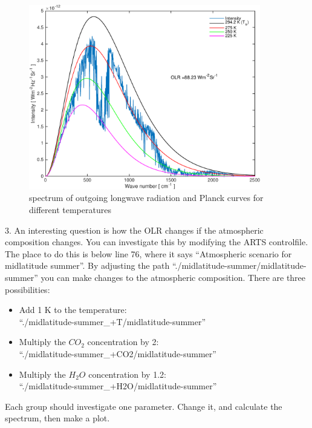 \documentclass[paper=a4, fontsize=11pt]{scrartcl} %
\numberwithin{figure}{section}
\begin{document}
\begin{figure}[H]
\centering
	\includegraphics[width=0.9\textwidth]{plots/olr.pdf}
	\caption{spectrum of outgoing longwave radiation and Planck curves for different temperatures}
\end{figure}

3. An interesting question is how the OLR changes if the atmospheric composition changes. 
You can investigate this by modifying the ARTS controlfile. The place to do this 
is below line 76, where it says “Atmospheric scenario for midlatitude summer”. 
By adjusting the path ``./midlatitude-summer/midlatitude-summer'' 
you can make changes to the atmospheric composition. There are three possibilities:
\begin{itemize}
	\item Add 1 K to the temperature: \\ ``./midlatitude-summer\_+T/midlatitude-summer''
	\item Multiply the $CO_{2}$ concentration by 2: \\ ``./midlatitude-summer\_+CO2/midlatitude-summer''
	\item Multiply the $H_{2}O$ concentration by 1.2: \\ ``./midlatitude-summer\_+H2O/midlatitude-summer'' \ \\
\end{itemize}

Each group should investigate one parameter. Change it, and calculate the spectrum, then make a plot. 
\end{document}
